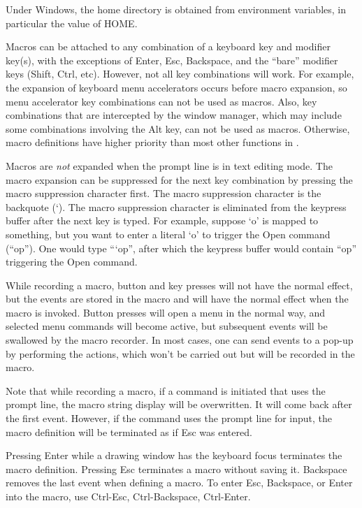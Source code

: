 Under Windows, the home directory is obtained from environment
variables, in particular the value of {\et HOME}.

Macros can be attached to any combination of a keyboard key and
modifier key(s), with the exceptions of {\kb Enter}, {\kb Esc}, {\kb
Backspace}, and the ``bare'' modifier keys ({\kb Shift}, {\kb Ctrl},
etc).  However, not all key combinations will work.  For example, the
expansion of keyboard menu accelerators occurs before macro expansion,
so menu accelerator key combinations can not be used as macros.  Also,
key combinations that are intercepted by the window manager, which may
include some combinations involving the {\kb Alt} key, can not be used
as macros.  Otherwise, macro definitions have higher priority than
most other functions in {\Xic}.

Macros are {\it not} expanded when the prompt line is in text editing
mode.  The macro expansion can be suppressed for the next key
combination by pressing the macro suppression character first.  The
macro suppression character is the backquote ({\vt `}).  The macro
suppression character is eliminated from the keypress buffer after the
next key is typed.  For example, suppose `{\vt o}' is mapped to
something, but you want to enter a literal `{\vt o}' to trigger the
{\cb Open} command (``{\vt op}'').  One would type ``{\vt `op}'',
after which the keypress buffer would contain ``{\vt op}'' triggering
the {\cb Open} command.

While recording a macro, button and key presses will not have the
normal effect, but the events are stored in the macro and will have
the normal effect when the macro is invoked.  Button presses will open
a menu in the normal way, and selected menu commands will become
active, but subsequent events will be swallowed by the macro recorder. 
In most cases, one can send events to a pop-up by performing the
actions, which won't be carried out but will be recorded in the macro.

Note that while recording a macro, if a command is initiated that uses
the prompt line, the macro string display will be overwritten.  It
will come back after the first event.  However, if the command uses
the prompt line for input, the macro definition will be terminated as
if {\kb Esc} was entered.

Pressing {\kb Enter} while a drawing window has the keyboard focus
terminates the macro definition.  Pressing {\kb Esc} terminates a
macro without saving it.  {\kb Backspace} removes the last event when
defining a macro.  To enter {\kb Esc}, {\kb Backspace}, or {\kb Enter}
into the macro, use {\kb Ctrl-Esc}, {\kb Ctrl-Backspace}, {\kb
Ctrl-Enter}.

